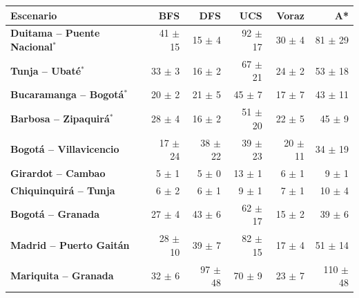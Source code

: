 \renewcommand{\arraystretch}{1.2}
\begin{tabular}{|l|r|r|r|r|r|}
\hline
\rowcolor{gray!20} \textbf{Escenario} & \textbf{BFS} & \textbf{DFS} & \textbf{UCS} & \textbf{Voraz} & \textbf{A*} \\
\hline
\textbf{Duitama -- Puente Nacional$^{*}$} & 41 $\pm$ 15 & 15 $\pm$ 4 & 92 $\pm$ 17 & 30 $\pm$ 4 & 81 $\pm$ 29 \\
\hline
\textbf{Tunja -- Ubaté$^{*}$} & 33 $\pm$ 3 & 16 $\pm$ 2 & 67 $\pm$ 21 & 24 $\pm$ 2 & 53 $\pm$ 18 \\
\hline
\textbf{Bucaramanga -- Bogotá$^{*}$} & 20 $\pm$ 2 & 21 $\pm$ 5 & 45 $\pm$ 7 & 17 $\pm$ 7 & 43 $\pm$ 11 \\
\hline
\textbf{Barbosa -- Zipaquirá$^{*}$} & 28 $\pm$ 4 & 16 $\pm$ 2 & 51 $\pm$ 20 & 22 $\pm$ 5 & 45 $\pm$ 9 \\
\hline
\textbf{Bogotá -- Villavicencio} & 17 $\pm$ 24 & 38 $\pm$ 22 & 39 $\pm$ 23 & 20 $\pm$ 11 & 34 $\pm$ 19 \\
\hline
\textbf{Girardot -- Cambao} & 5 $\pm$ 1 & 5 $\pm$ 0 & 13 $\pm$ 1 & 6 $\pm$ 1 & 9 $\pm$ 1 \\
\hline
\textbf{Chiquinquirá -- Tunja} & 6 $\pm$ 2 & 6 $\pm$ 1 & 9 $\pm$ 1 & 7 $\pm$ 1 & 10 $\pm$ 4 \\
\hline
\textbf{Bogotá -- Granada} & 27 $\pm$ 4 & 43 $\pm$ 6 & 62 $\pm$ 17 & 15 $\pm$ 2 & 39 $\pm$ 6 \\
\hline
\textbf{Madrid -- Puerto Gaitán} & 28 $\pm$ 10 & 39 $\pm$ 7 & 82 $\pm$ 15 & 17 $\pm$ 4 & 51 $\pm$ 14 \\
\hline
\textbf{Mariquita -- Granada} & 32 $\pm$ 6 & 97 $\pm$ 48 & 70 $\pm$ 9 & 23 $\pm$ 7 & 110 $\pm$ 48 \\
\hline
\end{tabular}
